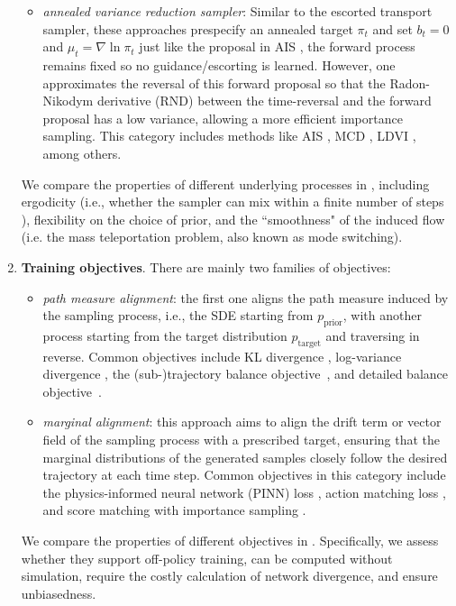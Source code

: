 \begin{enumerate}[leftmargin=*]
\begin{itemize}[leftmargin=*]
    \item \emph{annealed variance reduction sampler}: Similar to the escorted transport sampler, these approaches prespecify an annealed target $\pi_t$  and set $b_t=0$ and  $\mu_t = \nabla \ln \pi_t$ just like the proposal in AIS \citep{neal2001annealed,jarzynski1997nonequilibrium}, the forward process remains fixed so no guidance/escorting is learned. 
    However, one approximates the reversal of this forward proposal so that the Radon-Nikodym derivative (RND) between the time-reversal and the forward proposal has a low variance, allowing a more efficient importance sampling.
    This category includes methods like AIS \citep{neal2001annealed,jarzynski1997nonequilibrium}, MCD \citep{doucet2022score,zhang2021some,hartmann2019jarzynski}, LDVI \citep{geffner2023langevin}, among others. 
    \end{itemize}
    
  We compare the properties of different underlying processes in , including ergodicity (i.e., whether the sampler can mix within a finite number of steps \citep{albergo2023stochastic,huang2021schr,zhangpath,vargas2021bayesian,grenioux2024stochastic}), flexibility on the choice of prior, and the ``smoothness" \citep{chemseddine2024neural,woodard2009sufficient,tawn2020weight,syed2022non,phillips2024particle} of the induced flow
  (i.e. the mass teleportation problem, also known as mode switching).
    \item \textbf{Training objectives}.
    There are mainly two families of objectives:
    \begin{itemize}[leftmargin=*]
        \item \emph{path measure alignment}: the first one aligns the path measure induced by the sampling process, i.e., the SDE starting from $p_\text{prior}$, with another process starting from the target distribution $p_\text{target}$ and traversing in reverse. Common objectives include KL divergence \citep{zhangpath,vargas2021bayesian,vargasdenoising,doucet2022score,lahlou2023theorycontinuousgenerativeflow,berneroptimal,vargas2024transport}, log-variance divergence \citep{richterimproved}, the (sub-)trajectory balance objective~\citep{zhangdiffusion}, and detailed balance objective~\citep{bengio2021flow}. 
        \item \emph{marginal alignment}:  this approach aims to align the drift term or vector field of the sampling process with a prescribed target, ensuring that the marginal distributions of the generated samples closely follow the desired trajectory at each time step.
        Common objectives in this category include the physics-informed neural network (PINN) loss \citep{sun2024dynamical,albergo2024nets}, action matching loss \citep{albergo2024nets}, and score matching with importance sampling \citep{akhounditerated}.
    \end{itemize}
   We compare the properties of different objectives in . 
   Specifically, we assess whether they support off-policy training, can be computed without simulation, require the costly calculation of network divergence, and ensure unbiasedness. 
   

\end{enumerate}

